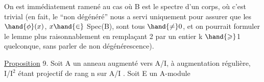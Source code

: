 On est immédiatement ramené au cas où B est le spectre d'un corps,
où c'est trivial (en fait, le ``non dégénéré'' nous a servi uniquement
 pour assurer que les $\hand{\phi}(x)$, $x \hand{\in}$ Spec(B), sont tous $\hand{\neq} 0$, et on pourrait
formuler le lemme plus raisonnablement en remplaçant 2 par un entier
k $\hand{\geqslant}$1 quelconque, sans parler de non dégénérescence).

\uline{Proposition} 9. Soit A un anneau augmenté vers A/I, à augmentation
régulière, I/I$^{2}$ étant projectif de rang n sur A/I . Soit E un A-module

